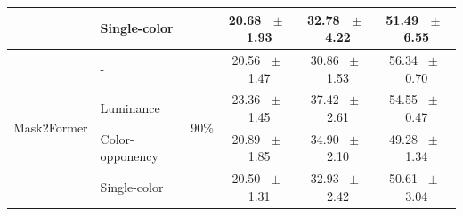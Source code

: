 \begin{table}[h]
\begin{tabular}{@{}l l c c c c@{}}
    & Single-color &  & 20.68 ~$\pm$~ 1.93 & 32.78 ~$\pm$~ 4.22 & 51.49 ~$\pm$~ 6.55 \\
    \midrule
    \multirow{4}{*}{Mask2Former} & - & \multirow{4}{*}{90\%} & 20.56 ~$\pm$~ 1.47 & 30.86 ~$\pm$~ 1.53 & 56.34 ~$\pm$~ 0.70 \\
    & Luminance &  & 23.36 ~$\pm$~ 1.45 & 37.42 ~$\pm$~ 2.61 & 54.55 ~$\pm$~ 0.47 \\
    & Color-opponency &  & 20.89 ~$\pm$~ 1.85 & 34.90 ~$\pm$~ 2.10 & 49.28 ~$\pm$~ 1.34 \\
    & Single-color &  & 20.50 ~$\pm$~ 1.31 & 32.93 ~$\pm$~ 2.42 & 50.61 ~$\pm$~ 3.04 \\
    \midrule
    \bottomrule
  \end{tabular}
  \label{tab:mask2former_dark_zurich}
\end{table}